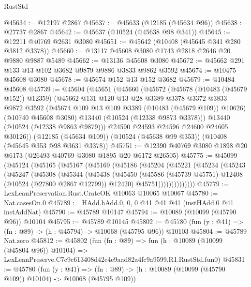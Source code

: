 \begin{lexlean}{RustStd}
\begin{coremodule}
@45634 := @12197 @2867
@45637 := @45633 (@12185 (@45634 @96))
@45638 := @27737 @2867
@45642 := @45637 (@10524 (@45638 @98 @341))
@45645 := @12211 @40769 @2631 @3080
@45651 := @45642 (@10408 (@45645 @341 @280 @3812 @3378))
@45660 := @13117 @45608 @3080 @1743 @2818 @2646 @20 @9880 @9887 @5489
@45662 := @13136 @45608 @3080
@45672 := @45662 @291 @133 @13 @102 @3682 @9879 @9886 @3833 @9862 @3592
@45674 := @10475 @45608 @3080
@45678 := @45674 @152 @13 @152 @3682
@45679 := @10484 @45608
@45739 := @45604
    (@45651
      (@45660
        (@45672
          (@45678 (@10483 (@45679 @152)) @12359)
          (@45662
            @131
            @120
            @13
            @28
            @3389
            @3378
            @3372
            @3833
            @9872
            @3592
            (@45674 @109 @13 @109 @3389 (@10483 (@45679 @109)) @10626)
            (@10740 @45608 @3080)
            @13440
            (@10524 (@12338 @9873 @3378)))
          @13440
          (@10524 (@12338 @9863 @9879)))
        @24590
        @24593
        @24596
        @24600
        @24605
        @30126))
    (@12185 (@45634 @109))
    (@10524 (@45638 @99 @353))
    (@10408 (@45645 @353 @98 @3631 @3378))
@45751 := @12390 @40769 @3080 @1898 @20 @6173 (@26493 @40769 @3080 @1895 @20 @6172 @26505)
@45775 := @45099
    (@45124
      (@45165
        (@45167
          (@45169
            (@45186
              (@45204
                (@45221
                  (@45234
                    (@45243
                      (@45247
                        (@45308
                          (@45344
                            (@45438
                              (@45450
                                (@45586
                                  (@45739 @45751)
                                  @12408
                                  (@10524 (@27800 @2867 @12799))
                                  @12420)
                                @45751))))))))))))))
@45779 := LexLeanPreservation.Rust.CrateOK @10063 @10065 @10067
@45780 := Nat.casesOn.{0}
@45789 := HAdd.hAdd.{0, 0, 0} @41 @41 @41 (instHAdd.{0} @41 instAddNat)
@45790 := @45789 @10147
@45794 := @10089 (@10099 (@45790 @96)) @10104
@45795 := @45789 @10145
@45802 := @45780 (fun (y : @41) => (fn : @89) -> (h : @45794) -> @10068 (@45795 @96)) @10103
@45804 := @45789 Nat.zero
@45812 := @45802
    (fun (fn : @89) =>
    fun (h : @10089 (@10099 (@45804 @96)) @10104) =>
    LexLeanPreserve.C7c9c613408d42c4e9aad82a4fc9a9599.R1.RustStd.fun0)
@45831 := @45780
    (fun (y : @41) =>
    (fn : @89) -> (h : @10089 (@10099 (@45790 @109)) @10104) -> @10068 (@45795 @109))

\end{coremodule}
\end{lexlean}
